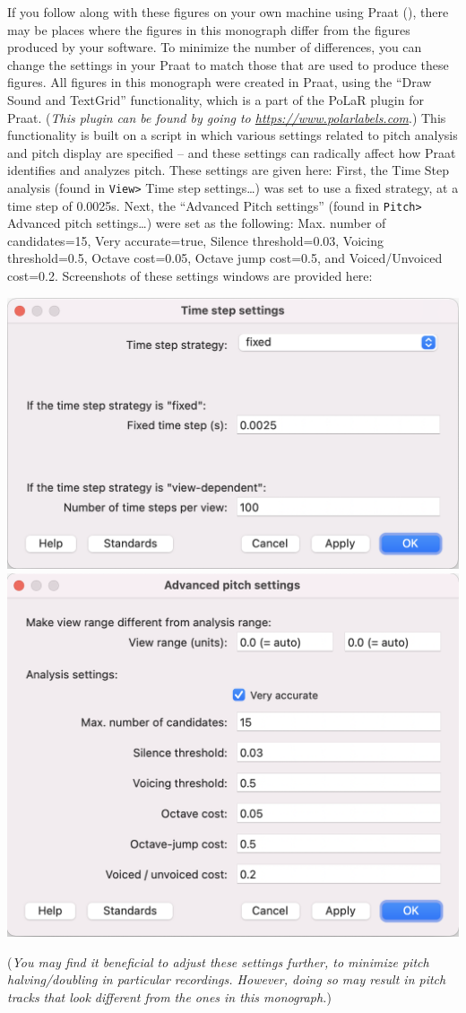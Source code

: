 \documentclass[11pt, twoside]{memoir}
\begin{document}
\begin{infobox}[frametitle=\textbf{A NOTE ON PRAAT SETTINGS}]
If you follow along with these figures on your own machine using Praat (\citealt{praat}), there may be places where the figures in this monograph differ from the figures produced by your software. To minimize the number of differences, you can change the settings in your Praat to match those that are used to produce these figures. All figures in this monograph were created in Praat, using the “Draw Sound and TextGrid” functionality, which is a part of the PoLaR plugin for Praat. (\textit{This plugin can be found by going to \url{https://www.polarlabels.com}}.) This functionality is built on a script in which various settings related to pitch analysis and pitch display are specified – and these settings can radically affect how Praat identifies and analyzes pitch. These settings are given here: First, the Time Step analysis (found in \texttt{View>} Time step settings\ldots) was set to use a fixed strategy, at a time step of 0.0025s. Next, the “Advanced Pitch settings” (found in \texttt{Pitch>} Advanced pitch settings\ldots) were set as the following: Max. number of candidates=15, Very accurate=true, Silence threshold=0.03, Voicing threshold=0.5, Octave cost=0.05, Octave jump cost=0.5, and Voiced/Unvoiced cost=0.2. Screenshots of these settings windows are provided here: \par\begingroup\centering
	\includegraphics[width=.475\linewidth]{Praat-time-step-settings.png} \includegraphics[width=.475\linewidth]{Praat-adv-pitch-settings.png} \par
	\endgroup (\textit{You may find it beneficial to adjust these settings further, to minimize pitch halving\slash doubling in particular recordings. However, doing so may result in pitch tracks that look different from the ones in this monograph.})
\label{note on praat settings}
\end{infobox}
\end{document}
